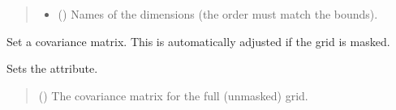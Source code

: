 \documentclass[letterpaper,10pt,english]{sphinxmanual}
\begin{document}
\begin{fulllineitems}
\begin{fulllineitems}
\begin{quote}
\begin{description}
\begin{itemize}
\item {}
\sphinxAtStartPar
{} (\sphinxstyleliteralemphasis{\sphinxupquote{{[}}}\sphinxstyleliteralemphasis{\sphinxupquote{{]}}}) \textendash{} Names of the dimensions (the order must match the bounds).

\end{itemize}

\sphinxAtStartPar
{}

\end{description}\end{quote}

\end{fulllineitems}


\begin{fulllineitems}
\label{\detokenize{grid:glomar_gridding.grid.Grid.set_covariance}}
\pysigstartsignatures
\pysiglinewithargsret
{}
{}
{}
\pysigstopsignatures
\sphinxAtStartPar
Set a covariance matrix. This is automatically adjusted if the grid is
masked.

\sphinxAtStartPar
Sets the  attribute.
\begin{quote}\begin{description}
\sphinxAtStartPar
{} (\sphinxstyleliteralemphasis{\sphinxupquote{ | }}) \textendash{} The covariance matrix for the full (unmasked) grid.

\sphinxAtStartPar
{}

\end{description}\end{quote}

\end{fulllineitems}



\end{fulllineitems}
\end{document}
